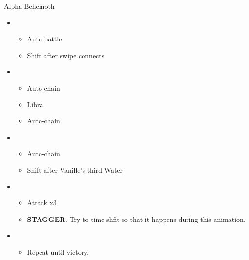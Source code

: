 \begin{multicols}{2}
\begin{battle}{Alpha Behemoth}
\begin{itemize}
    \item \first
    \begin{itemize}
        \item Auto-battle
        \item Shift after swipe connects
    \end{itemize}
    \item \third
    \begin{itemize}
        \item Auto-chain
        \item Libra
        \item Auto-chain
    \end{itemize}
    \item \fourth
    \begin{itemize}
        \item Auto-chain
        \item Shift after Vanille's third Water
    \end{itemize}
    \item \first
    \begin{itemize}
        \item Attack x3
        \item \textbf{STAGGER}. Try to time shfit so that it happens during this animation.
    \end{itemize}
    \item \fifth
    \begin{itemize}
        \item Repeat until victory.
    \end{itemize}
\end{itemize}
\end{battle}



 
\vfill


\end{multicols}
